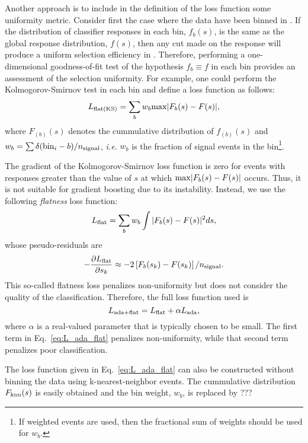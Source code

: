 Another approach is to include in the definition of the loss function some uniformity metric.  Consider first the case where the data have been binned in \y.  If the distribution of classifier responses in each bin, $f_b(s)$, is the same as the global response distribution, $f(s)$, then any cut made on the response will produce a uniform selection efficiency in \y.  Therefore, performing a one-dimensional goodness-of-fit test of the hypothesis $f_b \equiv f$ in each bin provides an assessment of the selection uniformity.  
For example, one could perform the Kolmogorov-Smirnov test in each bin and define a loss function as follows:
\begin{equation}
  L_{\rm flat(KS)} = \sum\limits_{b} w_b {\rm max}|F_b(s)-F(s)|,
\end{equation}
where $F_{(b)}(s)$ denotes the cummulative distribution of $f_{(b)}(s)$ and $w_b = \sum \delta({\rm bin}_i - b)/n_{\rm signal}$, {\em i.e.} $w_b$ is the fraction of signal events in the bin\footnote{If weighted events are used, then the fractional sum of weights should be used for $w_b$.}.   

The gradient of the Kolmogorov-Smirnov loss function is zero for events with responses greater than the value of $s$ at which ${\rm max}|F_b(s)-F(s)|$ occurs.  Thus, it is not suitable for gradient boosting due to its instability.  Instead, we use the following {\em flatness} loss function:
\begin{equation}
  L_{\rm flat} = \sum\limits_{b} w_b \int |F_b(s)-F(s)|^2 ds,
\end{equation}
whose pseudo-residuals are
\begin{equation}
 -\frac{\partial L_{\rm flat}}{\partial s_k} \approx - 2\left[F_b(s_k)-F(s_k)\right]/n_{\rm signal}.
\end{equation}
This so-called flatness loss penalizes non-uniformity but does not consider the quality of the classification.  Therefore, the full loss function used is 
\begin{equation}
\label{eq:L_ada_flat}
  L_{{\rm ada}+{\rm flat}} = L_{\rm flat} + \alpha L_{\rm ada},
\end{equation}  
where $\alpha$ is a real-valued parameter that is typically chosen to be small.  The first term in Eq.~\ref{eq:L_ada_flat} penalizes non-uniformity, while that second term penalizes poor classification.  

The loss function given in Eq.~\ref{eq:L_ada_flat} can also be constructed without binning the data using k-nearest-neighbor events.  The cummulative distribution $F_{\rm knn}(s)$ is easily obtained and the bin weight, $w_b$, is replaced by ???
